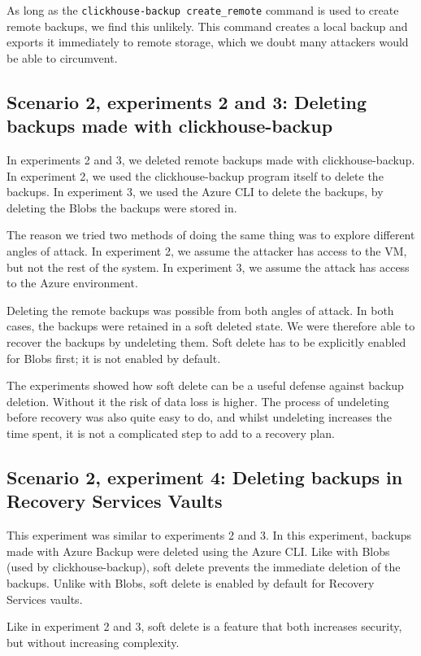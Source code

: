 As long as the \texttt{clickhouse-backup create\_remote} command is used to create remote backups, we find this unlikely. This command creates a local backup and exports it immediately to remote storage, which we doubt many attackers would be able to circumvent. 


\subsection{Scenario 2, experiments 2 and 3: Deleting backups made with clickhouse-backup}

In experiments 2 and 3, we deleted remote backups made with clickhouse-backup. In experiment 2, we used the clickhouse-backup program itself to delete the backups. In experiment 3, we used the Azure CLI to delete the backups, by deleting the Blobs the backups were stored in.

The reason we tried two methods of doing the same thing was to explore different angles of attack. In experiment 2, we assume the attacker has access to the VM, but not the rest of the system. In experiment 3, we assume the attack has access to the Azure environment.

Deleting the remote backups was possible from both angles of attack. In both cases, the backups were retained in a soft deleted state. We were therefore able to recover the backups by undeleting them. Soft delete has to be explicitly enabled for Blobs first; it is not enabled by default.

The experiments showed how soft delete can be a useful defense against backup deletion. Without it the risk of data loss is higher. The process of undeleting before recovery was also quite easy to do, and whilst undeleting increases the time spent, it is not a complicated step to add to a recovery plan. 

\subsection{Scenario 2, experiment 4: Deleting backups in Recovery Services Vaults}

This experiment was similar to experiments 2 and 3. In this experiment, backups made with Azure Backup were deleted using the Azure CLI. Like with Blobs (used by clickhouse-backup), soft delete prevents the immediate deletion of the backups. Unlike with Blobs, soft delete is enabled by default for Recovery Services vaults.

Like in experiment 2 and 3, soft delete is a feature that both increases security, but without increasing complexity. 


